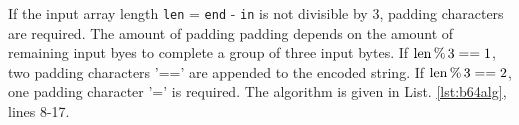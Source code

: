 \bigbreak
If the input array length \lstinline{len} = \lstinline{end} - \lstinline{in} is not divisible by $3$, padding characters are required. The amount of padding padding depends on the amount of remaining input byes to complete a group of three input bytes. If $\rm{len}\,\%\,3==1$, two padding characters '==' are appended to the encoded string. If $\rm{len}\,\%\,3==2$, one padding character '=' is required. The algorithm is given in List. \ref{lst:b64alg}, lines 8-17.